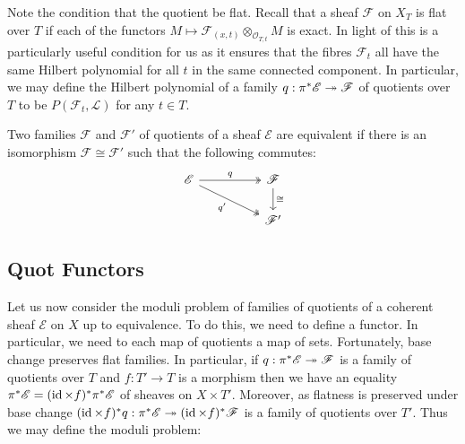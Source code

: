 \documentclass[12pt]{ociamthesis}  %
\begin{document}
Note the condition that the quotient be flat. Recall that a sheaf
$\mathscr F$ on $X_T$ is flat over $T$ if each of the functors
$M \mapsto \mathscr F_{(x,t)} \otimes_{\mathscr O_{T,t}} M$ is exact.
In light of \cite[III Theorem 9.9]{hartshorne1977} this is a
particularly useful condition for us as it ensures that the fibres
$\mathscr F_t$ all have the same Hilbert polynomial
for all $t$ in the same connected component. In particular,
we may define the Hilbert polynomial of a family
$q : \pi^*\mathscr E \twoheadrightarrow \mathscr F$ of quotients over $T$ to be
$P(\mathscr F_t,\mathscr L)$ for any $t\in T$.

Two families $\mathscr F$ and $\mathscr F'$ of quotients of a
sheaf $\mathscr E$ are equivalent if there is an isomorphism
$\mathscr F\cong\mathscr F'$ such that the following commutes:
\begin{equation}\label{eq:quotient_equivalence}
  \begin{tikzcd}
    {\mathscr E} && {\mathscr F} \\
    && {\mathscr F'}
    \arrow["q", two heads, from=1-1, to=1-3]
    \arrow["{q'}"', two heads, from=1-1, to=2-3]
    \arrow["\cong", from=1-3, to=2-3]
  \end{tikzcd}
\end{equation}

\subsection{Quot Functors}

Let us now consider the moduli problem of families of
quotients of a coherent sheaf $\mathscr E$ on $X$ up to equivalence.
To do this, we need to define a functor. In particular, we need to
each map of quotients a map of sets. Fortunately, base change preserves flat families.
In particular,
if $q : \pi^*\mathscr E \twoheadrightarrow \mathscr F$ is a family of quotients over $T$ and
$f : T' \to T$ is a morphism then we have an equality
$\pi^*\mathscr E = (\operatorname{id}\times f)^*\pi^*\mathscr E$
of sheaves on $X\times T'$.
Moreover, as flatness is preserved under base change \cite[\href{https://stacks.math.columbia.edu/tag/01U9}{Tag 01U9}]{stacks-project}
$(\operatorname{id}\times f)^*q : \pi^*\mathscr E \twoheadrightarrow (\operatorname{id}\times f)^*\mathscr F$
is a family of quotients over $T'$. Thus we may define the moduli problem:
\end{document}
